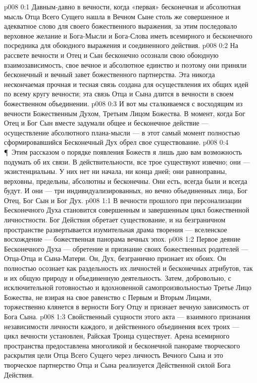 \vs p008 0:1 Давным\hyp{}давно в вечности, когда «первая» бесконечная и абсолютная мысль Отца Всего Сущего нашла в Вечном Сыне столь же совершенное и адекватное слово для своего божественного выражения, за этим последовало верховное желание и Бога\hyp{}Мысли и Бога\hyp{}Слова иметь всемирного и бесконечного посредника для обоюдного выражения и соединенного действия.
\vs p008 0:2 На рассвете вечности и Отец и Сын бесконечно осознали свою обоюдную взаимозависимость, свое вечное и абсолютное единство и поэтому они приняли бесконечный и вечный завет божественного партнерства. Эта никогда нескончаемая прочная и тесная связь создана для осуществления их общих идей по всему кругу вечности; эта связь Отца и Сына длится в вечности в своем божественном объединении.
\vs p008 0:3 И вот мы сталкиваемся с восходящим из вечности Божественным Духом, Третьим Лицом Божества. В момент, когда Бог Отец и Бог Сын вместе задумали общее и бесконечное действие --- осуществление абсолютного плана\hyp{}мысли --- в этот самый момент полностью сформировавшийся Бесконечный Дух обрел свое существование.
\vs p008 0:4 \P\ Этим рассказом о порядке появления Божеств я лишь даю вам возможность подумать об их связи. В действительности, все трое существуют извечно; они --- экзистенциальны. У них нет ни начала, ни конца дней; они равноправны, верховны, предельны, абсолютны и бесконечны. Они есть, всегда были и всегда будут. И они --- три индивидуализированных, но вечно объединенных лица, Бог Отец, Бог Сын и Бог Дух.
\vs p008 1:1 В вечности прошлого при персонализации Бесконечного Духа становится совершенным и завершенным цикл божественной личностности. Бог Действия обретает существование, и на безграничном пространстве развертывается изумительная драма творения --- вселенское восхождение --- божественная панорама вечных эпох.
\vs p008 1:2 Первое деяние Бесконечного Духа --- обретение и признание своих божественных родителей --- Отца\hyp{}Отца и Сына\hyp{}Матери. Он, Дух, безгранично признает их обоих. Он полностью осознает как раздельность их личностей и бесконечных атрибутов, так и их общую природу и объединенную деятельность. Затем, добровольно, с исключительной готовностью и вдохновенной самопроизвольностью Третье Лицо Божества, не взирая на свое равенство с Первым и Вторым Лицами, торжественно клянется в верности Богу Отцу и признает вечную зависимость от Бога Сына.
\vs p008 1:3 Свойственный сущности этого акта --- взаимного признания независимости личности каждого, и действенного объединения всех троих --- цикл вечности установлен, Райская Троица существует. Арена всемирного пространства предоставлена многоликой и бесконечной панораме творческого раскрытия цели Отца Всего Сущего через личность Вечного Сына и это творческое партнерство Отца и Сына реализуется Действенной силой Бога Действия.

